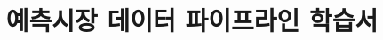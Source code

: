 \documentclass[11pt]{book}
\title{예측시장 데이터 파이프라인 학습서}
\author{}
\date{}
\begin{document}
\frontmatter
\maketitle
\tableofcontents

\mainmatter







\backmatter
\nocite{arch-mvp1}


\end{document}
